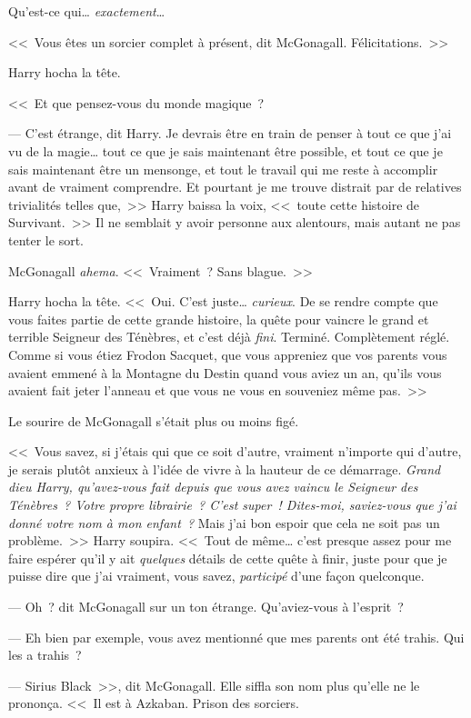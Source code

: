 Qu'est-ce qui… \emph{exactement}…

<<~Vous êtes un sorcier complet à présent, dit McGonagall. Félicitations.~>>

Harry hocha la tête.

<<~Et que pensez-vous du monde magique~?

--- C'est étrange, dit Harry. Je devrais être en train de penser à tout ce que j'ai vu de la magie… tout ce que je sais maintenant être possible, et tout ce que je sais maintenant être un mensonge, et tout le travail qui me reste à accomplir avant de vraiment comprendre. Et pourtant je me trouve distrait par de relatives trivialités telles que,~>> Harry baissa la voix, <<~toute cette histoire de Survivant.~>> Il ne semblait y avoir personne aux alentours, mais autant ne pas tenter le sort.

McGonagall \emph{ahema}. <<~Vraiment~? Sans blague.~>>

Harry hocha la tête. <<~Oui. C'est juste… \emph{curieux}. De se rendre compte que vous faites partie de cette grande histoire, la quête pour vaincre le grand et terrible Seigneur des Ténèbres, et c'est déjà \emph{fini}. Terminé. Complètement réglé. Comme si vous étiez Frodon Sacquet, que vous appreniez que vos parents vous avaient emmené à la Montagne du Destin quand vous aviez un an, qu'ils vous avaient fait jeter l'anneau et que vous ne vous en souveniez même pas.~>>

Le sourire de McGonagall s'était plus ou moins figé.

<<~Vous savez, si j'étais qui que ce soit d'autre, vraiment n'importe qui d'autre, je serais plutôt anxieux à l'idée de vivre à la hauteur de ce démarrage. \emph{Grand dieu Harry, qu'avez-vous fait depuis que vous avez vaincu le Seigneur des Ténèbres~? Votre propre librairie~? C'est super~! Dites-moi, saviez-vous que j'ai donné votre nom à mon enfant~?} Mais j'ai bon espoir que cela ne soit pas un problème.~>> Harry soupira. <<~Tout de même… c'est presque assez pour me faire espérer qu'il y ait \emph{quelques} détails de cette quête à finir, juste pour que je puisse dire que j'ai vraiment, vous savez, \emph{participé} d'une façon quelconque.

--- Oh~? dit McGonagall sur un ton étrange. Qu'aviez-vous à l'esprit~?

--- Eh bien par exemple, vous avez mentionné que mes parents ont été trahis. Qui les a trahis~?

--- Sirius Black~>>, dit McGonagall. Elle siffla son nom plus qu'elle ne le prononça. <<~Il est à Azkaban. Prison des sorciers.

